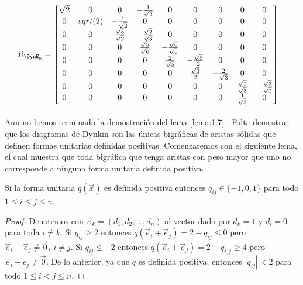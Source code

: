 \begin{align*}
 R_{\DynE_{8}} &  = \begin{bmatrix}
 \sqrt{2} & 0 & 0 & -\frac{1}{\sqrt{2}} & 0 & 0 & 0 & 0 & 0\\
 0 & sqrt(2) & - \frac{1}{\sqrt{2}}& 0 & 0 & 0 & 0 & 0 & 0\\
 0 & 0 & \frac{\sqrt{3}}{\sqrt{2}} & -\frac{\sqrt{2}}{\sqrt{3}} & 0 & 0 & 0 & 0 & 0\\
 0 & 0 & 0 & \frac{\sqrt{5}}{\sqrt{6}} & -\frac{\sqrt{6}}{\sqrt{5}} & 0 & 0 & 0 & 0\\
 0 & 0 & 0 & 0 & \frac{2}{\sqrt{5}} & -\frac{\sqrt{5}}{2} & 0 & 0 & 0\\
 0 & 0 & 0 & 0 & 0 & \frac{\sqrt{3}}{2} & -\frac{2}{\sqrt{3}} & 0 & 0\\
 0 & 0 & 0 & 0 & 0 & 0 & 0 & \frac{\sqrt{2}}{\sqrt{3}} & - \frac{\sqrt{3}}{\sqrt{2}}\\
 0 & 0 & 0 & 0 & 0 & 0 & 0 & \frac{1}{\sqrt{2}} & 0\\
 \end{bmatrix}
\end{align*}

\paragraph{}
Aun no hemos terminado la demostración del lema \ref{lema:1.7} . Falta demostrar que los diagramas de Dynkin son las únicas bigráficas de aristas sólidas que definen formas unitarias definidas positivas. Comenzaremos con el siguiente lema, el cual muestra que toda bigráfica que tenga aristas con peso mayor que uno no corresponde a ninguna forma unitaria definida positiva.

\begin{lemma}
Si la forma unitaria $q(\overrightarrow{x})$ es definida positiva entonces $q_{ij} \in \{-1,0,1\}$ para todo $1\leq i \le j \leq n$.
\label{lema:1.8}
\end{lemma}

\begin{proof}
Denotemos con $ \overrightarrow{e}_{k} = \left(d_{1},d_{2}, \ldots , d_{n}\right)$ al vector dado por $d_{k} = 1$ y $d_{i} = 0$ para toda $i\neq k$. Si $q_{ij} \geq 2$ entonces $q(\overrightarrow{e}_{i} + \overrightarrow{e}_{j}) = 2 - q_{ij} \leq 0$ pero $\overrightarrow{e}_{i} - \overrightarrow{e}_{j} \neq \overrightarrow{0}, ~ i \neq j$. Si $q_{ij} \leq -2$ entonces $q\left(\overrightarrow{e}_{i}+ \overrightarrow{e}_{j}\right) = 2 - q_{i,j} \geq 4$ pero $\overrightarrow{e}_{i} - e_{j} \neq \overrightarrow{0}$. De lo anterior, ya que $q$ es definida positiva, entonces $|q_{ij}| < 2$ para todo $1 \leq i < j \leq n$.
\end{proof}

